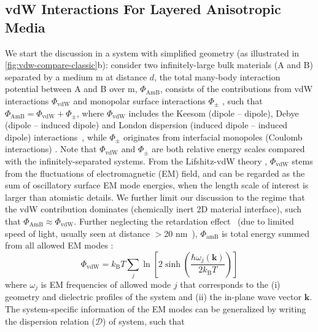 \subsection{vdW Interactions  For Layered Anisotropic Media}
\label{sec:vdw-gener-model-layer}

We start the discussion in a system with simplified geometry (as
illustrated in \autoref{fig:vdw-compare-classic}b): consider two
infinitely-large bulk materials (A and B) separated by a medium m at
distance \(d\), the total many-body interaction potential between A
and B over m, \(\Phi_{\mathrm{AmB}}\), consists of the contributions
from vdW interactions \(\Phi_{\mathrm{vdW}}\) and mono\-polar surface
interactions \(\Phi_{\pm}\)
\cite{van_Oss_1987_monopolar,Van_Oss_1988}, such that
$\Phi_{\mathrm{AmB}} = \Phi_{\mathrm{vdW}} + \Phi_{\pm}$, where
\(\Phi_{\mathrm{vdW}}\) includes the Keesom (dipole -- dipole), Debye
(dipole -- induced dipole) and London dispersion (induced dipole --
induced dipole) interactions~\cite{Israelachvili_2011_book}, while
\(\Phi_{\pm}\) originates from interfacial monopoles (Coulomb
interactions) \cite{van_Oss_1987_monopolar}.
%
Note that $\Phi_{\mathrm{vdW}}$ and $\Phi_{\pm}$ are both relative
energy scales compared with the infinitely-separated systems.
%
From the Lifshitz-vdW theory \cite{Dzyaloshinskii_1961_lifshitz},
\(\Phi_{\mathrm{vdW}}\) stems from the fluctuations of electromagnetic
(EM) field, and can be regarded as the sum of oscillatory surface EM
mode energies, when the length scale of interest is larger than
atomistic details.
%
We further limit our discussion to the regime that the vdW
contribution dominates (\ie chemically inert 2D material interface),
such that $\Phi_{\mathrm{AmB}} \approx \Phi_{\mathrm{vdW}}$.  Further
neglecting the retardation effect~\cite{Dryden_2015_gecko} (due to
limited speed of light, usually seen at distance $>$20
nm~\cite{parsegian_van_2010_book}),
$\Phi_{\mathrm{amB}}$ is total energy summed from all allowed EM modes
\cite{Li_2005_diele}:
\begin{equation}
\label{eq:vdw-EM-energy}
\Phi_{\mathrm{vdW}} = k_{\mathrm{B}} T \sum_{j} \ln \left[2 \sinh\left(\frac{\hbar \omega_{j}(\mathbf{k})}{2 k_{\mathrm{B}} T}\right)\right] 
\end{equation}
where \(\omega_{j}\) is EM frequencies of allowed mode $j$ that
corresponds to the (i) geometry and dielectric profiles of the system
and (ii) the in-plane wave vector \(\mathbf{k}\).
%
The system-specific information of the EM modes can be generalized by
writing the dispersion relation ($\mathcal{D}$) of system, such that
